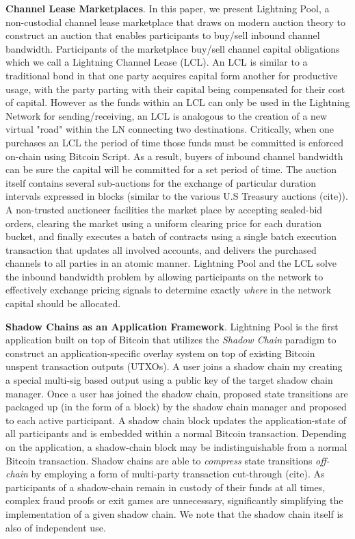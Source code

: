 \documentclass[12pt,a4paper]{article}
\theoremstyle{definition}
\begin{document}
\textbf{Channel Lease Marketplaces}. In this paper, we present Lightning Pool,
a non-custodial channel lease marketplace that draws on modern auction theory
to construct an auction that enables participants to buy/sell inbound channel
bandwidth. Participants of the marketplace buy/sell channel capital obligations
which we call a Lightning Channel Lease (LCL). An LCL is similar to a
traditional bond in that one party acquires capital form another for productive
usage, with the party parting with their capital being compensated for their
cost of capital. However as the funds within an LCL can only be used in the
Lightning Network for sending/receiving, an LCL is analogous to the creation of
a new virtual "road" within the LN connecting two destinations. Critically,
when one purchases an LCL the period of time those funds must be committed is
enforced on-chain using Bitcoin Script. As a result, buyers of inbound channel
bandwidth can be sure the capital will be committed for a set period of time.
The auction itself contains several sub-auctions for the exchange of particular
duration intervals expressed in blocks (similar to the various U.S Treasury
auctions (cite)). A non-trusted auctioneer facilities the market place by
accepting sealed-bid orders, clearing the market using a uniform clearing price
for each duration bucket, and finally executes a batch of contracts using a
single batch execution transaction that updates all involved accounts, and
delivers the purchased channels to all parties in an atomic manner. Lightning
Pool and the LCL solve the inbound bandwidth problem by allowing participants
on the network to effectively exchange pricing signals to determine exactly
\emph{where} in the network capital should be allocated. 


\textbf{Shadow Chains as an Application Framework}. Lightning Pool is the first
application built on top of Bitcoin that utilizes the \emph{Shadow Chain}
paradigm to construct an application-specific overlay system on top of existing
Bitcoin unspent transaction outputs (UTXOs). A user joins a shadow chain my
creating a special multi-sig based output using a public key of the target
shadow chain manager. Once a user has joined the shadow chain, proposed state
transitions are packaged up (in the form of a block) by the shadow chain
manager and proposed to each active participant. A shadow chain block updates
the application-state of all participants and is embedded within a normal
Bitcoin transaction. Depending on the application, a shadow-chain block may be
indistinguishable from a normal Bitcoin transaction. Shadow chains are able to
\emph{compress} state transitions \emph{off-chain} by employing a form of
multi-party transaction cut-through (cite). As participants of a shadow-chain
remain in custody of their funds at all times, complex fraud proofs or exit
games are unnecessary, significantly simplifying the implementation of a given
shadow chain. We note that the shadow chain itself is also of independent use. 
\end{document}
